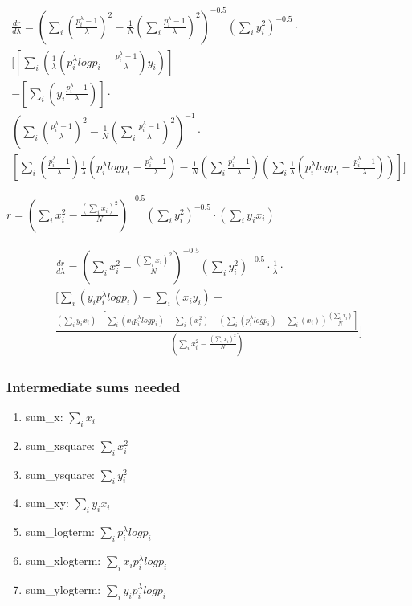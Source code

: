 \begin{multline}
\frac{dr}{d\lambda}=
\left(\sum_i\left(\frac{p_i^{\lambda}-1}{\lambda}\right)^2-\frac{1}{N}\left(\sum_i \frac{p_i^{\lambda}-1}{\lambda}\right)^2  \right)^{-0.5}
\left(\sum_i{y_i^2}\right)^{-0.5}\cdot  \\
[
\left[
\sum_i\left(\frac{1}{\lambda}\left(p_i^{\lambda}log{p_i}-\frac{p_i^{\lambda}-1}{\lambda}\right)y_i\right)
\right]  \\
-
\left[\sum_i \left(y_i\frac{p_i^{\lambda}-1}{\lambda}\right)\right]\cdot\\
\left(\sum_i\left(\frac{p_i^{\lambda}-1}{\lambda}\right)^2-\frac{1}{N}\left(\sum_i \frac{p_i^{\lambda}-1}{\lambda}\right)^2  \right)^{-1}
\cdot\\
\left[
\sum_i\left(\frac{p_i^{\lambda}-1}{\lambda} \right)\frac{1}{\lambda}\left(p_i^{\lambda}log{p_i}-\frac{p_i^{\lambda}-1}{\lambda}\right)
-\frac{1}{N}\left(\sum_i \frac{p_i^{\lambda}-1}{\lambda}\right) \left(\sum_i \frac{1}{\lambda}\left(p_i^{\lambda}log{p_i}-\frac{p_i^{\lambda}-1}{\lambda}\right) \right)
\right]
]
\end{multline}

\begin{math}
r=\left(\sum_i{x_i^2}-\frac{\left(\sum_i{x_i}\right)^2}{N}\right)^{-0.5}
\left(\sum_i{y_i^2}\right)^{-0.5}\cdot
\left(\sum_i{y_ix_i}\right)
\end{math}

\begin{multline}
\frac{dr}{d\lambda}=
\left(\sum_i{x_i^2}-\frac{\left(\sum_i{x_i}\right)^2}{N}\right)^{-0.5}
\left(\sum_i{y_i^2}\right)^{-0.5}\cdot\frac{1}{\lambda}\cdot  \\
[
\sum_i\left(y_ip_i^{\lambda}log{p_i}\right) -
\sum_i\left(x_iy_i\right)
-\\
\frac{\left(\sum_i{y_ix_i}\right) \cdot
\left[
\sum_i \left(x_ip_i^{\lambda}log{p_i}\right) - \sum_i \left(x_i^2\right)
-\left( \sum_i \left(p_i^{\lambda}log{p_i}\right) -\sum_i \left(x_i\right) \right)\frac{\left(\sum_i{x_i}\right)}{N}
\right]}
{\left(\sum_i{x_i^2}-\frac{\left(\sum_i{x_i}\right)^2}{N}\right)}
]
\end{multline}

\subsubsection*{Intermediate sums needed}
\begin{enumerate}
\item sum\_x: $\sum_i{x_i}$
\item sum\_xsquare: $\sum_i{x_i^2}$
\item sum\_ysquare: $\sum_i{y_i^2}$
\item sum\_xy: $\sum_i{y_ix_i}$
\item sum\_logterm: $\sum_i{p_i^{\lambda}log{p_i}}$
\item sum\_xlogterm: $\sum_i{x_ip_i^{\lambda}log{p_i}}$
\item sum\_ylogterm: $\sum_i{y_ip_i^{\lambda}log{p_i}}$

\end{enumerate}

